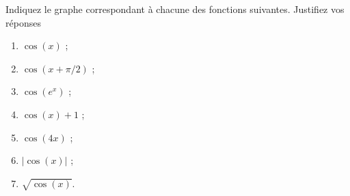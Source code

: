 
\begin{exercice}\label{exoDS_2010_3bis}
 
Indiquez le graphe correspondant à chacune des fonctions suivantes. Justifiez vos réponses
\begin{multicols}{3}
  \begin{enumerate}
  \item $\cos (x) $ ;
  \item $\cos (x+\pi/2) $ ;
  \item $\cos(e^x) $ ;
  \item $ \cos(x)+1$ ;
  \item $\cos (4x) $ ; 
  \item $ |\cos(x)|$ ;
  \item $ \sqrt{\cos(x)}$.
  \end{enumerate}
\end{multicols}


\newcommand{\CaptionFigExercicebis}{Les graphes à considérer} 



\end{exercice}
